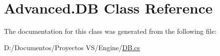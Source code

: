 \hypertarget{class_advanced_1_1_d_b}{}\section{Advanced.\+DB Class Reference}
\label{class_advanced_1_1_d_b}


The documentation for this class was generated from the following file\+:\begin{DoxyCompactItemize}
\item 
D\+:/\+Documentos/\+Proyectos V\+S/\+Engine/\mbox{\hyperlink{_d_b_8cs}{D\+B.\+cs}}\end{DoxyCompactItemize}
